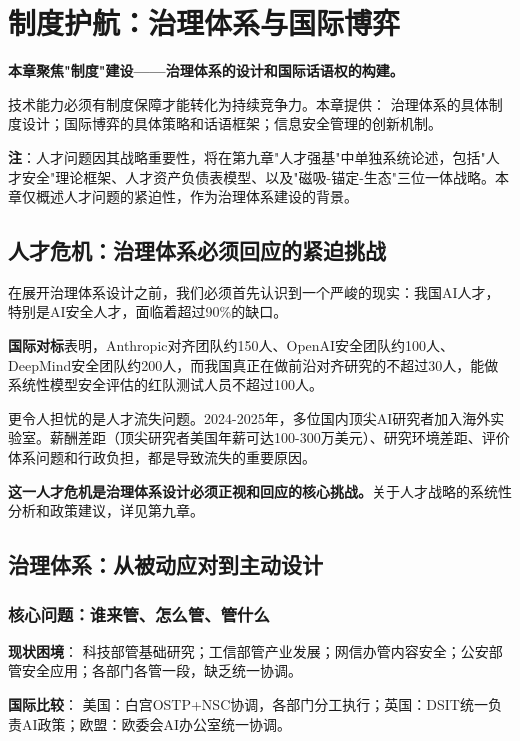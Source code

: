 \chapter{制度护航：治理体系与国际博弈}

\textbf{本章聚焦"制度"建设——治理体系的设计和国际话语权的构建。}

技术能力必须有制度保障才能转化为持续竞争力。本章提供：
治理体系的具体制度设计；国际博弈的具体策略和话语框架；信息安全管理的创新机制。

\textbf{注}：人才问题因其战略重要性，将在第九章"人才强基"中单独系统论述，包括"人才安全"理论框架、人才资产负债表模型、以及"磁吸-锚定-生态"三位一体战略。本章仅概述人才问题的紧迫性，作为治理体系建设的背景。

\section{人才危机：治理体系必须回应的紧迫挑战}

在展开治理体系设计之前，我们必须首先认识到一个严峻的现实：我国AI人才，特别是AI安全人才，面临着超过90\%的缺口。

\textbf{国际对标}表明，Anthropic对齐团队约150人、OpenAI安全团队约100人、DeepMind安全团队约200人，而我国真正在做前沿对齐研究的不超过30人，能做系统性模型安全评估的红队测试人员不超过100人。

更令人担忧的是人才流失问题。2024-2025年，多位国内顶尖AI研究者加入海外实验室。薪酬差距（顶尖研究者美国年薪可达100-300万美元）、研究环境差距、评价体系问题和行政负担，都是导致流失的重要原因。

\textbf{这一人才危机是治理体系设计必须正视和回应的核心挑战。}关于人才战略的系统性分析和政策建议，详见第九章。

\section{治理体系：从被动应对到主动设计}

\subsection{核心问题：谁来管、怎么管、管什么}

\textbf{现状困境}：
科技部管基础研究；工信部管产业发展；网信办管内容安全；公安部管安全应用；各部门各管一段，缺乏统一协调。

\textbf{国际比较}：
美国：白宫OSTP+NSC协调，各部门分工执行；英国：DSIT统一负责AI政策；欧盟：欧委会AI办公室统一协调。

